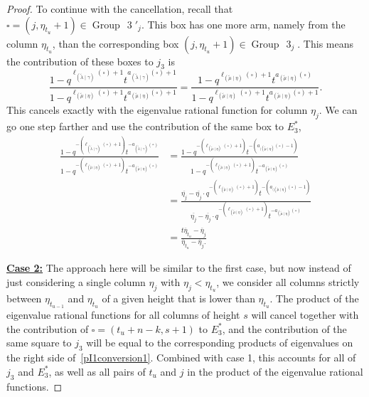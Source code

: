 \documentclass[ALCO]{cedram}
\newcommand{\mutilde}{{\widetilde{\mu}}}
\newcommand{\lambdatilde}{{\widetilde{\lambda}}}
\newcommand{\lambdatildegamma}{{(\lambdatilde \mid \gamma)}}
\newcommand{\mutildeeta}{{(\mutilde \mid \eta)}}
\newcommand{\leg}[1]{{\ell_{#1}(\square)}}
\newcommand{\armtwo}[1]{{a_{#1}(\square)}}
\newcommand{\group}[1]{\operatorname{Group}\,\operatorname{#1}}
\newcommand{\jthree}{j_3}
\newcommand{\Estarthree}{E^*_3}
\begin{document}
\begin{proof}
To continue with the cancellation, recall that $\square = (j,\eta_{t_u}+1) \in \group{3}'_j$. This box has one more arm, namely from the column $\eta_{t_u}$, than the corresponding box $(j,\eta_{t_u}+1) \in \group{3}_j$. This means the contribution of these boxes to $\jthree$ is
\[  \frac{1-q^{\leg{\lambdatildegamma}+1} t^{\armtwo{\lambdatildegamma}+1}}{1-q^{\leg{\mutildeeta}+1} t^{\armtwo{\mutildeeta}+1}} =\frac{1-q^{\leg{\mutildeeta}+1} t^{\armtwo{\mutildeeta}}}{1-q^{\leg{\mutildeeta}+1} t^{\armtwo{\mutildeeta}+1}}. \]
This cancels exactly with the eigenvalue rational function for column $\eta_j$. We can go one step farther and use the contribution of the same box to $\Estarthree$,
\begin{align*}
    \frac{1-q^{-(\leg{\lambdatildegamma}+1)}t^{-\armtwo{\lambdatildegamma}}}{1-q^{-(\leg{\mutildeeta}+1)}t^{-\armtwo{\mutildeeta}}} &= \frac{1-q^{-(\leg{\mutildeeta}+1)}t^{-(\armtwo{(\mutildeeta}-1)}}{1-q^{-(\leg{\mutildeeta}+1)}t^{-\armtwo{\mutildeeta}}}\\
    &=\frac{\overline{\eta_j}-\overline{\eta_j} \cdot q^{-(\leg{\mutildeeta}+1)}t^{-(\armtwo{(\mutildeeta}-1)}}{\overline{\eta_j}-\overline{\eta_j} \cdot q^{-(\leg{\mutildeeta}+1)}t^{-\armtwo{\mutildeeta}}}\\
    &= \frac{t\overline{\eta}_{t_u} - \overline{\eta}_j}{\overline{\eta}_{t_u} - \overline{\eta}_j.}
\end{align*}


\underline{\textbf{Case 2:}} The approach here will be similar to the first case, but now instead of just considering a single column $\eta_j$ with $\eta_j < \eta_{t_u}$, we consider all columns strictly between $\eta_{t_{u-1}}$ and $\eta_{t_u}$ of a given height that is lower than $\eta_{t_u}$. The product of the eigenvalue rational functions for all columns of height $s$ will cancel together with the contribution of $\square = (t_u+n-k,s+1)$ to $\Estarthree$, and the contribution of the same square to $\jthree$ will be equal to the corresponding products of eigenvalues on the right side of~\eqref{pI1conversion1}. Combined with case 1, this accounts for all of $\jthree$ and $\Estarthree$, as well as all pairs of $t_u$ and $j$ in the product of the eigenvalue rational functions.


\end{proof}
\end{document}
